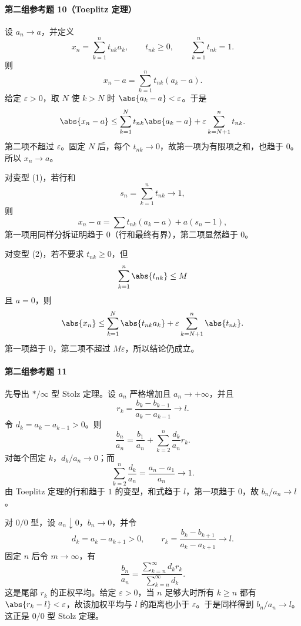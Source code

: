 \paragraph{第二组参考题 10（Toeplitz 定理）}
\begin{xsolution}
设 $a_n\to a$，并定义
\[
  x_n=\sum_{k=1}^nt_{nk}a_k,
  \qquad t_{nk}\ge0,
  \qquad \sum_{k=1}^nt_{nk}=1.
\]
则
\[
  x_n-a=\sum_{k=1}^nt_{nk}(a_k-a).
\]
给定 $\varepsilon>0$，取 $N$ 使 $k>N$ 时 $\abs{a_k-a}<\varepsilon$。于是
\[
  \abs{x_n-a}
  \le\sum_{k=1}^Nt_{nk}\abs{a_k-a}
   +\varepsilon\sum_{k=N+1}^nt_{nk}.
\]
第二项不超过 $\varepsilon$。固定 $N$ 后，每个 $t_{nk}\to0$，故第一项为有限项之和，也趋于 $0$。所以 $x_n\to a$。

对变型 (1)，若行和
\[
  s_n=\sum_{k=1}^nt_{nk}\to1,
\]
则
\[
  x_n-a=\sum t_{nk}(a_k-a)+a(s_n-1),
\]
第一项用同样分拆证明趋于 $0$（行和最终有界），第二项显然趋于 $0$。

对变型 (2)，若不要求 $t_{nk}\ge0$，但
\[
  \sum_{k=1}^n\abs{t_{nk}}\le M
\]
且 $a=0$，则
\[
  \abs{x_n}
  \le\sum_{k=1}^N\abs{t_{nk}a_k}
   +\varepsilon\sum_{k=N+1}^n\abs{t_{nk}}.
\]
第一项趋于 $0$，第二项不超过 $M\varepsilon$，所以结论仍成立。
\end{xsolution}

\paragraph{第二组参考题 11}
\begin{xsolution}
先导出 $*/\infty$ 型 Stolz 定理。设 $a_n$ 严格增加且 $a_n\to+\infty$，并且
\[
  r_k=\frac{b_k-b_{k-1}}{a_k-a_{k-1}}\to l.
\]
令 $d_k=a_k-a_{k-1}>0$。则
\[
  \frac{b_n}{a_n}
  =\frac{b_1}{a_n}
   +\sum_{k=2}^n\frac{d_k}{a_n}r_k.
\]
对每个固定 $k$，$d_k/a_n\to0$；而
\[
  \sum_{k=2}^n\frac{d_k}{a_n}
  =\frac{a_n-a_1}{a_n}\to1.
\]
由 Toeplitz 定理的行和趋于 $1$ 的变型，和式趋于 $l$，第一项趋于 $0$，故 $b_n/a_n\to l$。

对 $0/0$ 型，设 $a_n\downarrow0$，$b_n\to0$，并令
\[
  d_k=a_k-a_{k+1}>0,
  \qquad
  r_k=\frac{b_k-b_{k+1}}{a_k-a_{k+1}}\to l.
\]
固定 $n$ 后令 $m\to\infty$，有
\[
  \frac{b_n}{a_n}
  =\frac{\sum_{k=n}^{\infty}d_kr_k}{\sum_{k=n}^{\infty}d_k}.
\]
这是尾部 $r_k$ 的正权平均。给定 $\varepsilon>0$，当 $n$ 足够大时所有 $k\ge n$ 都有 $\abs{r_k-l}<\varepsilon$，故该加权平均与 $l$ 的距离也小于 $\varepsilon$。于是同样得到 $b_n/a_n\to l$。这正是 $0/0$ 型 Stolz 定理。
\end{xsolution}

